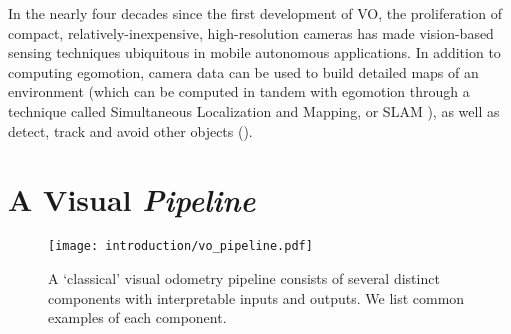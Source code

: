 

 
In the nearly four decades since the first development of VO, the proliferation of compact, relatively-inexpensive, high-resolution cameras has made vision-based sensing techniques ubiquitous in mobile autonomous applications. In addition to computing egomotion, camera data can be used to build detailed maps of an environment (which can be computed in tandem with egomotion through a technique called Simultaneous Localization and Mapping, or SLAM \citep{Cadena2016-ds}), as well as detect, track and avoid other objects (). 

\section{A Visual \textit{Pipeline}}

\begin{figure}
\begin{center}
		\texttt{[image: introduction/vo\_pipeline.pdf]}
		\caption{A `classical' visual odometry pipeline consists of several distinct components with interpretable inputs and outputs. We list common examples of each component. }
  	\label{fig:intro_vo_pipeline}
\end{center}
\end{figure}


